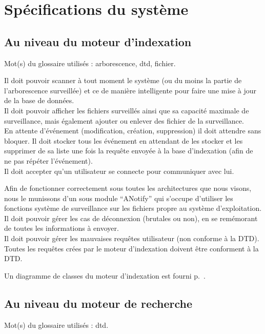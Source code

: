 \documentclass[a4paper,12pt]{report}
\begin{document}
\chapter{Spécifications du système}

\section{Au niveau du moteur d'indexation}
Mot(s) du glossaire utilisés : \gls{arborescence}, \gls{dtd}, \gls{fichier}.

Il doit pouvoir scanner à tout moment le système (ou du moins la partie de l'arborescence surveillée) et ce de manière intelligente pour faire une mise à jour de la base de données.\\
Il doit pouvoir afficher les fichiers surveillés ainsi que sa capacité maximale de surveillance, mais également ajouter ou enlever des fichier de la surveillance.\\
En attente d'événement (modification, création, suppression) il doit attendre sans bloquer. Il doit stocker tous les événement en attendant de les stocker et les supprimer de sa liste une fois la requête envoyée à la base d'indexation (afin de ne pas répéter l'événement).\\
Il doit accepter qu'un utilisateur se connecte pour communiquer avec lui.

Afin de fonctionner correctement sous toutes les architectures que nous visons, nous le munissons d'un sous module \enquote{ANotify} qui s'occupe d'utiliser les fonctions système de surveillance sur les fichiers propre au système d'exploitation.\\
Il doit pouvoir gérer les cas de déconnexion (brutales ou non), en se remémorant de toutes les informations à envoyer.\\
Il doit pouvoir gérer les mauvaises requêtes utilisateur (non conforme à la DTD). Toutes les requêtes crées par le moteur d'indexation doivent être conforment à la DTD.

Un diagramme de classes du moteur d'indexation est fourni p.~\pageref{diagramme_classes_mi}.

\section{Au niveau du moteur de recherche}
Mot(s) du glossaire utilisés : \gls{dtd}.
\end{document}
